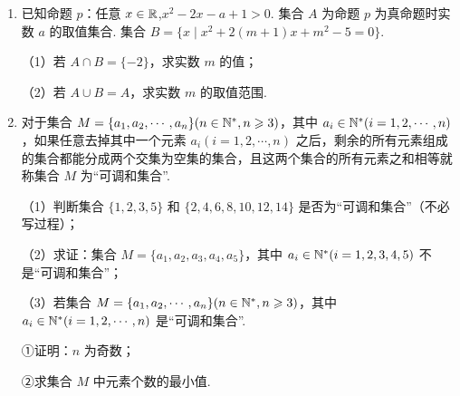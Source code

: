 \documentclass[a4paper,11pt]{article}
\begin{document}
\begin{enumerate}
\item 已知命题 $p$：任意 $x\in\mathbb{R}$,$x^2-2x-a+1>0$. 集合 $A$ 为命题 $p$ 为真命题时实数 $a$ 的取值集合. 集合 $B=\{x\mid x^2+2(m+1)x+m^2-5=0\}$.

（1）若 $A\cap B=\{-2\}$，求实数 $m$ 的值；

（2）若 $A\cup B=A$，求实数 $m$ 的取值范围.

\ifanswer
\solbegin
{}
\solend
\fi

\item 对于集合 $M=\{a_1,a_2,\cdots,a_n\}(n\in\mathbb{N}^*,n\geqslant3)$，其中 $a_i\in\mathbb{N}^*(i=1,2,\cdots,n)$，如果任意去掉其中一个元素 $a_i(i=1,2,\cdots,n)$ 之后，剩余的所有元素组成的集合都能分成两个交集为空集的集合，且这两个集合的所有元素之和相等就称集合 $M$ 为“可调和集合”.

（1）判断集合 $\{1,2,3,5\}$ 和 $\{2,4,6,8,10,12,14\}$ 是否为“可调和集合”（不必写过程）；

（2）求证：集合 $M=\{a_1,a_2,a_3,a_4,a_5\}$，其中 $a_i\in\mathbb{N}^*(i=1,2,3,4,5)$ 不是“可调和集合”；

（3）若集合 $M=\{a_1,a_2,\cdots,a_n\}(n\in\mathbb{N}^*,n\geqslant3)$，其中 $a_i\in\mathbb{N}^*(i=1,2,\cdots,n)$ 是“可调和集合”.

①证明：$n$ 为奇数；

②求集合 $M$ 中元素个数的最小值.


\end{enumerate}
\end{document}
